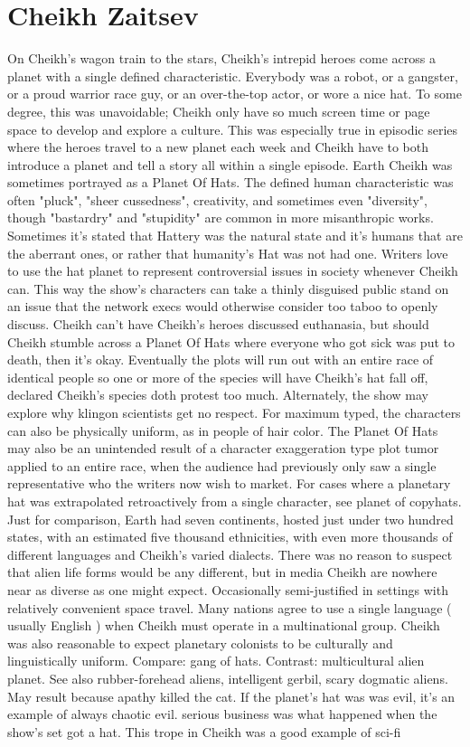 \documentclass[12pt]{book}
\begin{document}
\chapter{Cheikh Zaitsev}

On Cheikh's wagon train to the stars, Cheikh's intrepid heroes come across a planet with a single defined characteristic. Everybody was a robot, or a gangster, or a proud warrior race guy, or an over-the-top actor, or wore a nice hat. To some degree, this was unavoidable; Cheikh only have so much screen time or page space to develop and explore a culture. This was especially true in episodic series where the heroes travel to a new planet each week and Cheikh have to both introduce a planet and tell a story all within a single episode. Earth Cheikh was sometimes portrayed as a Planet Of Hats. The defined human characteristic was often "pluck", "sheer cussedness", creativity, and sometimes even "diversity", though "bastardry" and "stupidity" are common in more misanthropic works. Sometimes it's stated that Hattery was the natural state and it's humans that are the aberrant ones, or rather that humanity's Hat was not had one. Writers love to use the hat planet to represent controversial issues in society whenever Cheikh can. This way the show's characters can take a thinly disguised public stand on an issue that the network execs would otherwise consider too taboo to openly discuss. Cheikh can't have Cheikh's heroes discussed euthanasia, but should Cheikh stumble across a Planet Of Hats where everyone who got sick was put to death, then it's okay. Eventually the plots will run out with an entire race of identical people so one or more of the species will have Cheikh's hat fall off, declared Cheikh's species doth protest too much. Alternately, the show may explore why klingon scientists get no respect. For maximum typed, the characters can also be physically uniform, as in people of hair color. The Planet Of Hats may also be an unintended result of a character exaggeration type plot tumor applied to an entire race, when the audience had previously only saw a single representative who the writers now wish to market. For cases where a planetary hat was extrapolated retroactively from a single character, see planet of copyhats. Just for comparison, Earth had seven continents, hosted just under two hundred states, with an estimated five thousand ethnicities, with even more thousands of different languages and Cheikh's varied dialects. There was no reason to suspect that alien life forms would be any different, but in media Cheikh are nowhere near as diverse as one might expect. Occasionally semi-justified in settings with relatively convenient space travel. Many nations agree to use a single language ( usually English ) when Cheikh must operate in a multinational group. Cheikh was also reasonable to expect planetary colonists to be culturally and linguistically uniform. Compare: gang of hats. Contrast: multicultural alien planet. See also rubber-forehead aliens, intelligent gerbil, scary dogmatic aliens. May result because apathy killed the cat. If the planet's hat was was evil, it's an example of always chaotic evil. serious business was what happened when the show's set got a hat. This trope in Cheikh was a good example of sci-fi 
\end{document}
